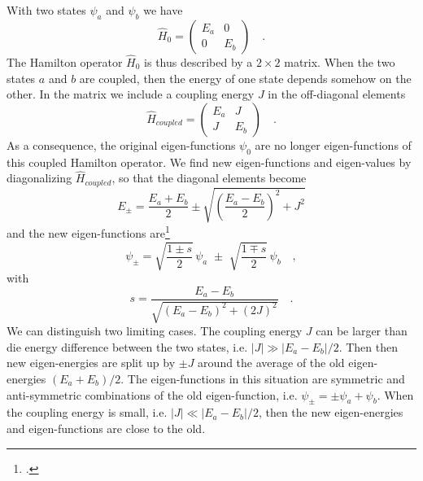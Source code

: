 With two states $\psi_a$ and $\psi_b$ we have
\begin{equation}
\hat{H}_0  = \begin{pmatrix}  E_a & 0 \\ 0 & E_b \end{pmatrix} 
	  \quad .
\end{equation}
The Hamilton operator $\hat{H}_0$ is thus described by a $2 \times 2$ matrix. When the two states $a$ and $b$ are coupled, then the energy of one state depends somehow on the other. In the matrix we include a coupling energy $J$ in the off-diagonal elements
\begin{equation}
\hat{H}_{coupled}  = \begin{pmatrix}  E_a & J \\ J & E_b \end{pmatrix} 
\quad . 
\end{equation}
As a consequence, the original eigen-functions $\psi_0$ are no longer eigen-functions of this coupled Hamilton operator. We find new eigen-functions and eigen-values by diagonalizing $\hat{H}_{coupled}$, so that the diagonal elements become
\begin{equation}
 E_\pm = \frac{E_a + E_b}{2} \pm \sqrt{ \left( \frac{E_a - E_b}{2} \right)^2 + J^2 }
\end{equation}
and the new  eigen-functions are\footcite[eq. 8.10]{Parson}
\begin{equation}
 \psi_{\pm} = 
\sqrt{\frac{1 \pm s}{2}} \,  \psi_a \, \,  \pm \, \, \sqrt{\frac{1 \mp s}{2}}  \, \psi_b \quad ,
\end{equation}
with
\begin{equation}
s = \frac{E_a - E_b}{\sqrt{(E_a - E_b)^2 + (2J)^2}} \quad .
\end{equation}
%
We can distinguish two limiting cases. The coupling energy $J$ can be larger than die energy difference between the two states, i.e. $|J| \gg |E_a - E_b| / 2$. Then then new eigen-energies are split up by $\pm J$ around the average of the old eigen-energies $(E_a + E_b) /2$. The eigen-functions in this situation are symmetric and anti-symmetric combinations of the old eigen-function, i.e. $\psi_\pm = \pm \psi_a + \psi_b$. When the coupling energy is small, i.e. $|J| \ll |E_a - E_b| / 2$, then the new eigen-energies and eigen-functions are close to the old.



